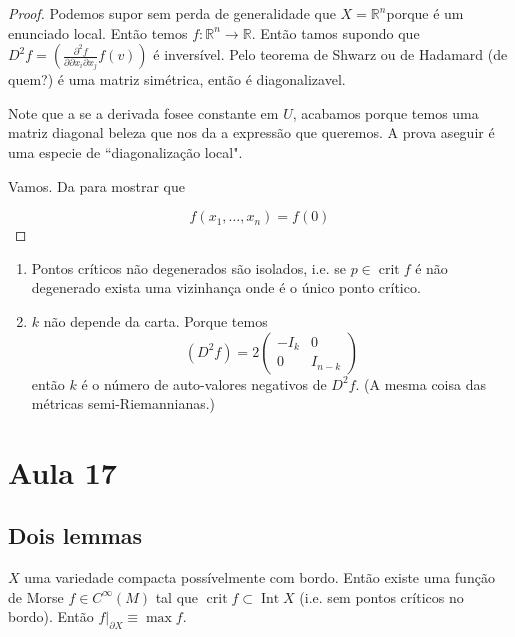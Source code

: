 \begin{proof}\leavevmode
Podemos supor sem perda de generalidade que \(X=\mathbb{R}^n\)porque é um enunciado local. Então temos \(f: \mathbb{R}^n \to \mathbb{R}\). Então tamos supondo que \(D^2f=\left(\frac{\partial ^2 f}{\partial \partial x_i \partial x_j}f(v)\right) \) é inversível. Pelo teorema de Shwarz ou de Hadamard (de quem?) é uma matriz simétrica, então é diagonalizavel.

Note que a se a derivada fosee constante em \(U\), acabamos porque temos uma matriz diagonal beleza que nos da a expressão que queremos. A prova aseguir é uma especie de ``diagonalização local".

Vamos. Da para mostrar que 

\[f(x_1,\ldots,x_n)= f(0)\]

\end{proof}

\begin{coro}\leavevmode
\begin{enumerate}
\item Pontos críticos não degenerados são isolados, i.e. se \(p \in \operatorname{crit}f\) é não degenerado exista uma vizinhança onde é o único ponto crítico.
\item \(k\) não depende da carta. Porque temos
	\[(D^2f)=2 \begin{pmatrix} -I_k&  0\\ 0 &  I_{n-k} \end{pmatrix} \]
então \(k\) é o número de auto-valores negativos de \(D^2f\). (A mesma coisa das métricas semi-Riemannianas.)
\end{enumerate}
\end{coro}

\section{Aula 17}

\subsection{Dois lemmas}

\begin{lemma}\leavevmode
\(X\) uma variedade compacta possívelmente com bordo. Então existe uma função de Morse \(f \in C^\infty(M)\) tal que \(\operatorname{crit}f \subset \operatorname{Int}X\) (i.e. sem pontos críticos no bordo). Então \(f|_{\partial X}\equiv \operatorname{max}f\).
\end{lemma}

